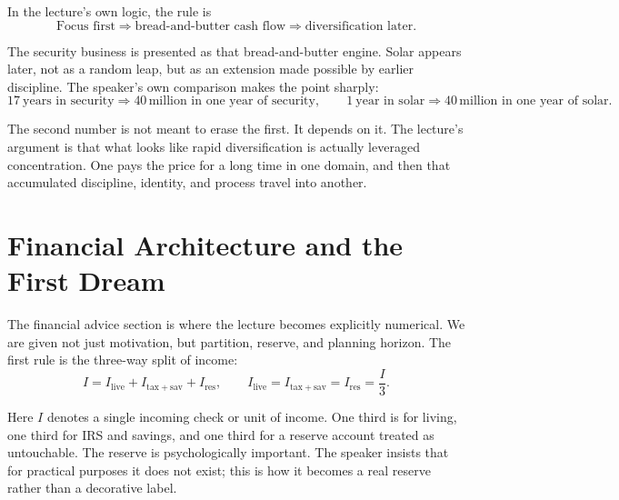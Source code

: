 In the lecture's own logic, the rule is
\begin{equation}
\text{Focus first}
\Longrightarrow
\text{bread-and-butter cash flow}
\Longrightarrow
\text{diversification later}.
\end{equation}

The security business is presented as that bread-and-butter engine. Solar appears later, not as a random leap, but as an extension made possible by earlier discipline. The speaker's own comparison makes the point sharply:
\begin{equation}
17\ \text{years in security} \Longrightarrow 40\,\text{million in one year of security},
\qquad
1\ \text{year in solar} \Longrightarrow 40\,\text{million in one year of solar}.
\end{equation}

The second number is not meant to erase the first. It depends on it. The lecture's argument is that what looks like rapid diversification is actually leveraged concentration. One pays the price for a long time in one domain, and then that accumulated discipline, identity, and process travel into another.

\section{Financial Architecture and the First Dream}

The financial advice section is where the lecture becomes explicitly numerical. We are given not just motivation, but partition, reserve, and planning horizon. The first rule is the three-way split of income:
\begin{equation}
I = I_{\mathrm{live}} + I_{\mathrm{tax+sav}} + I_{\mathrm{res}},
\qquad
I_{\mathrm{live}} = I_{\mathrm{tax+sav}} = I_{\mathrm{res}} = \frac{I}{3}.
\end{equation}

Here \(I\) denotes a single incoming check or unit of income. One third is for living, one third for IRS and savings, and one third for a reserve account treated as untouchable. The reserve is psychologically important. The speaker insists that for practical purposes it does not exist; this is how it becomes a real reserve rather than a decorative label.

\begin{figure}
\centering
{}
\end{figure}

